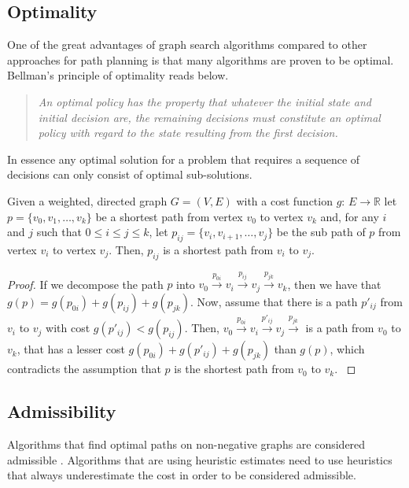 \subsection{Optimality}
One of the great advantages of graph search algorithms compared to other approaches for path planning is that many algorithms are proven to be optimal. Bellman's principle of optimality reads below.
\begin{quotation}
    \noindent \emph{An optimal policy has the property that whatever the initial state and initial decision are, the remaining decisions must constitute an optimal policy with regard to the state resulting from the first decision.} \cite{Bellman.2003}
\end{quotation}

In essence any optimal solution for a problem that requires a sequence of decisions can only consist of optimal sub-solutions.

\begin{lemma}
    Given a weighted, directed graph $G = (V,E)$ with a cost function $g$: $E \rightarrow \mathbb{R}$ let $p = \{v_0, v_1,\ldots, v_k\}$ be a shortest path from vertex $v_0$ to vertex $v_k$ and, for any $i$ and $j$ such that $0 \leq i \leq j \leq k$, let $p_{ij} = \{v_i, v_{i+1},\ldots, v_j\}$ be the sub path of $p$ from vertex $v_i$ to vertex $v_j$. Then, $p_{ij}$ is a shortest path from $v_i$ to $v_j$.
\end{lemma}
 
\begin{proof}
    If we decompose the path $p$ into $v_0 \xrightarrow{p_{0i}} v_i \xrightarrow{p_{ij}} v_j \xrightarrow{p_{jk}} v_k$, then we have that $g(p) = g(p_{0i}) + g(p_{ij}) + g(p_{jk})$. Now, assume that there is a path $p'_{ij}$ from $v_i$ to $v_j$ with cost $g(p'_{ij}) < g(p_{ij})$. Then, $v_0 \xrightarrow{p_{0i}} v_i \xrightarrow{p'_{ij}} v_j \xrightarrow{p_{jk}}$ is a path from $v_0$ to $v_k$, that has a lesser cost $g(p_{0i}) + g(p'_{ij}) + g(p_{jk})$ than $g(p)$, which contradicts the assumption that $p$ is the shortest path from $v_0$ to $v_k$. \cite{Cormen.2009}
\end{proof}

\subsection{Admissibility}
Algorithms that find optimal paths on non-negative graphs are considered admissible \cite{Hart.1968}. Algorithms that are using heuristic estimates need to use heuristics that always underestimate the cost in order to be considered admissible.

